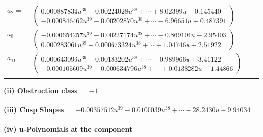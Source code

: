 \documentclass[1p]{elsarticle_modified}
\theoremstyle{definition}
\begin{document}
\begin{tabular}{m{7pt} m{180pt} m{7pt} m{180pt} }
\flushright $a_{2}=$&$\begin{pmatrix}0.000887834 u^{39}+0.00224028 u^{38}+\cdots+8.02399 u-0.145440\\-0.000846462 u^{39}-0.00202870 u^{38}+\cdots-6.96651 u+0.487391\end{pmatrix}$ \\
\flushright $a_{8}=$&$\begin{pmatrix}-0.000654257 u^{39}-0.00227174 u^{38}+\cdots-0.869104 u-2.95403\\0.000283061 u^{39}+0.000673324 u^{38}+\cdots+1.04746 u+2.51922\end{pmatrix}$ \\
\flushright $a_{11}=$&$\begin{pmatrix}0.000643096 u^{39}+0.00183202 u^{38}+\cdots-0.989966 u+3.41122\\-0.000105609 u^{39}-0.000634796 u^{38}+\cdots+0.0138282 u-1.44866\end{pmatrix}$\\&\end{tabular}
\flushleft \textbf{(ii) Obstruction class $= -1$}\\~\\
\flushleft \textbf{(iii) Cusp Shapes $= -0.00357512 u^{39}-0.0100039 u^{38}+\cdots-28.2430 u-9.94034$}\\~\\
\newpage\renewcommand{\arraystretch}{1}
\flushleft \textbf{(iv) u-Polynomials at the component}\newline \\
\end{document}
